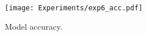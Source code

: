 \begin{figure}[!t]
    \centering  
    \texttt{[image: Experiments/exp6\_acc.pdf]}
    \caption{Model accuracy.}
    \label{eva:model}
\end{figure}